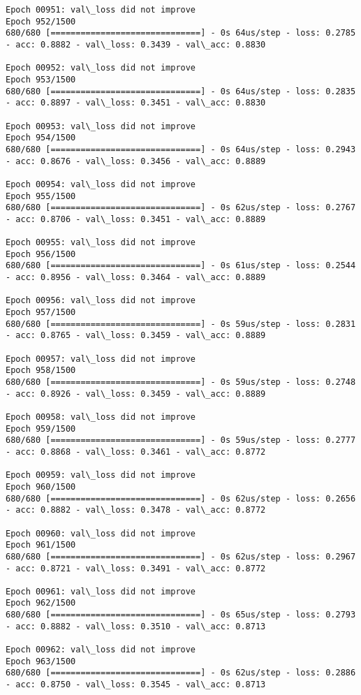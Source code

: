 \documentclass[11pt]{article}
\begin{document}
\begin{Verbatim}[commandchars=\\\{\}]
Epoch 00951: val\_loss did not improve
Epoch 952/1500
680/680 [==============================] - 0s 64us/step - loss: 0.2785 - acc: 0.8882 - val\_loss: 0.3439 - val\_acc: 0.8830

Epoch 00952: val\_loss did not improve
Epoch 953/1500
680/680 [==============================] - 0s 64us/step - loss: 0.2835 - acc: 0.8897 - val\_loss: 0.3451 - val\_acc: 0.8830

Epoch 00953: val\_loss did not improve
Epoch 954/1500
680/680 [==============================] - 0s 64us/step - loss: 0.2943 - acc: 0.8676 - val\_loss: 0.3456 - val\_acc: 0.8889

Epoch 00954: val\_loss did not improve
Epoch 955/1500
680/680 [==============================] - 0s 62us/step - loss: 0.2767 - acc: 0.8706 - val\_loss: 0.3451 - val\_acc: 0.8889

Epoch 00955: val\_loss did not improve
Epoch 956/1500
680/680 [==============================] - 0s 61us/step - loss: 0.2544 - acc: 0.8956 - val\_loss: 0.3464 - val\_acc: 0.8889

Epoch 00956: val\_loss did not improve
Epoch 957/1500
680/680 [==============================] - 0s 59us/step - loss: 0.2831 - acc: 0.8765 - val\_loss: 0.3459 - val\_acc: 0.8889

Epoch 00957: val\_loss did not improve
Epoch 958/1500
680/680 [==============================] - 0s 59us/step - loss: 0.2748 - acc: 0.8926 - val\_loss: 0.3459 - val\_acc: 0.8889

Epoch 00958: val\_loss did not improve
Epoch 959/1500
680/680 [==============================] - 0s 59us/step - loss: 0.2777 - acc: 0.8868 - val\_loss: 0.3461 - val\_acc: 0.8772

Epoch 00959: val\_loss did not improve
Epoch 960/1500
680/680 [==============================] - 0s 62us/step - loss: 0.2656 - acc: 0.8882 - val\_loss: 0.3478 - val\_acc: 0.8772

Epoch 00960: val\_loss did not improve
Epoch 961/1500
680/680 [==============================] - 0s 62us/step - loss: 0.2967 - acc: 0.8721 - val\_loss: 0.3491 - val\_acc: 0.8772

Epoch 00961: val\_loss did not improve
Epoch 962/1500
680/680 [==============================] - 0s 65us/step - loss: 0.2793 - acc: 0.8882 - val\_loss: 0.3510 - val\_acc: 0.8713

Epoch 00962: val\_loss did not improve
Epoch 963/1500
680/680 [==============================] - 0s 62us/step - loss: 0.2886 - acc: 0.8750 - val\_loss: 0.3545 - val\_acc: 0.8713


\end{Verbatim}
\end{document}
